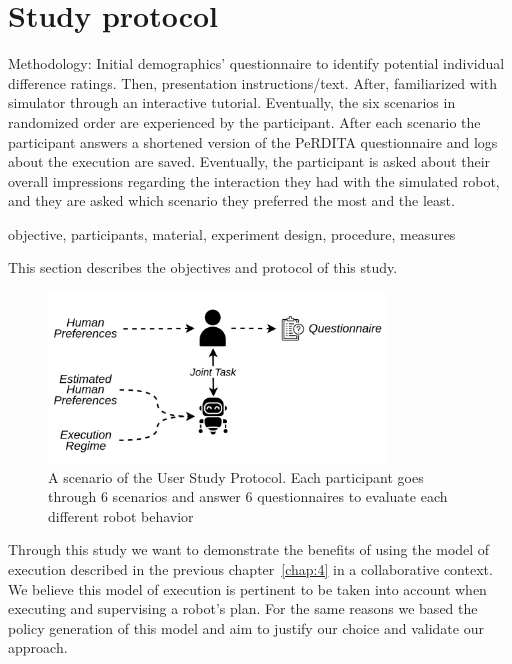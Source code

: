 \section{Study protocol}

Methodology: 
Initial demographics' questionnaire to identify potential individual difference ratings. Then, presentation instructions/text. After, familiarized with simulator through an interactive tutorial. Eventually, the six scenarios in randomized order are experienced by the participant. After each scenario the participant answers a shortened version of the PeRDITA questionnaire and logs about the execution are saved. Eventually, the participant is asked about their overall impressions regarding the interaction they had with the simulated robot, and they are asked which scenario they preferred the most and the least. 

objective, participants, material, experiment design, procedure, measures

This section describes the objectives and protocol of this study.  



\begin{figure}
    \centering
    \includegraphics[width=0.8\textwidth]{images/Chapter5/UserStudyProcedure.png}
    \caption{A scenario of the User Study Protocol. Each participant goes through 6 scenarios and answer 6 questionnaires to evaluate each different robot behavior}
    \label{fig:user_study_protocol}
\end{figure}




Through this study we want to demonstrate the benefits of using the model of execution described in the previous chapter~\ref{chap:4} in a collaborative context. We believe this model of execution is pertinent to be taken into account when executing and supervising a robot's plan. For the same reasons we based the policy generation of this model and aim to justify our choice and validate our approach.

